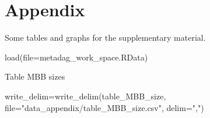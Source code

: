 \documentclass[
  letterpaper,
  DIV=11,
  numbers=noendperiod]{scrreprt}
\newenvironment{Shaded}{}{}
\newcommand{\AttributeTok}[1]{\textcolor[rgb]{0.78,0.47,0.87}{#1}}
\newcommand{\FunctionTok}[1]{\textcolor[rgb]{0.38,0.69,0.94}{#1}}
\newcommand{\NormalTok}[1]{\textcolor[rgb]{0.67,0.70,0.75}{#1}}
\newcommand{\OtherTok}[1]{\textcolor[rgb]{0.15,0.68,0.38}{#1}}
\newcommand{\StringTok}[1]{\textcolor[rgb]{0.60,0.76,0.47}{#1}}
\begin{document}

\hypertarget{appendix}{%
\chapter{Appendix}\label{appendix}}

Some tables and graphs for the supplementary material.

\begin{Shaded}
\begin{Highlighting}[]
\FunctionTok{load}\NormalTok{(}\AttributeTok{file=}\StringTok{\textquotesingle{}metadag\_work\_space.RData\textquotesingle{}}\NormalTok{)}
\end{Highlighting}
\end{Shaded}

Table MBB sizes

\begin{Shaded}
\begin{Highlighting}[]
\NormalTok{write\_delim}\OtherTok{=}\FunctionTok{write\_delim}\NormalTok{(table\_MBB\_size,}
                        \AttributeTok{file=}\StringTok{"data\_appendix/table\_MBB\_size.csv"}\NormalTok{,}
                        \AttributeTok{delim=}\StringTok{","}\NormalTok{)}
\end{Highlighting}
\end{Shaded}
\end{document}
